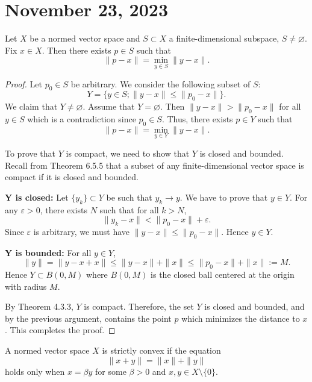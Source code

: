 \newpage
\section{November 23, 2023}


\begin{theorem}[6.6.1]
Let \( X \) be a normed vector space and \( S \subset X \) a finite-dimensional subspace, \( S \neq \varnothing \). Fix \( x \in X \). Then there exists \( p \in S \) such that
\[ \|p - x\| = \min_{y \in S} \|y - x\|. \]
\end{theorem}

\begin{proof}
Let \( p_0 \in S \) be arbitrary. We consider the following subset of \( S \):
\[ Y = \{ y \in S; \|y - x\| \leq \|p_0 - x\| \}. \]
We claim that \( Y \neq \varnothing \). Assume that \( Y = \varnothing \). Then \( \|y - x\| > \|p_0 - x\| \) for all \( y \in S \) which is a contradiction since \( p_0 \in S \). Thus, there exists \( p \in Y \) such that
\[ \|p - x\| = \min_{y \in Y} \|y - x\|. \]

To prove that \( Y \) is compact, we need to show that \( Y \) is closed and bounded. Recall from Theorem 6.5.5 that a subset of any finite-dimensional vector space is compact if it is closed and bounded.

\textbf{Y is closed:} Let \( \{y_k\} \subset Y \) be such that \( y_k \to y \). We have to prove that \( y \in Y \). For any \( \varepsilon > 0 \), there exists \( N \) such that for all \( k > N \),
\[ \|y_k - x\| < \|p_0 - x\| + \varepsilon. \]
Since \( \varepsilon \) is arbitrary, we must have \( \|y - x\| \leq \|p_0 - x\|. \) Hence \( y \in Y \).

\textbf{Y is bounded:} For all \( y \in Y \),
\[ \|y\| = \|y - x + x\| \leq \|y - x\| + \|x\| \leq \|p_0 - x\| + \|x\| := M. \]
Hence \( Y \subset B(0, M) \) where \( B(0, M) \) is the closed ball centered at the origin with radius \( M \).

By Theorem 4.3.3, \( Y \) is compact. Therefore, the set \( Y \) is closed and bounded, and by the previous argument, contains the point \( p \) which minimizes the distance to \( x \). This completes the proof.
\end{proof}

\begin{definition}[6.6.2]
A normed vector space \( X \) is strictly convex if the equation
\[ \|x + y\| = \|x\| + \|y\| \]
holds only when \( x = \beta y \) for some \( \beta > 0 \) and \( x, y \in X \setminus \{0\} \).
\end{definition}

